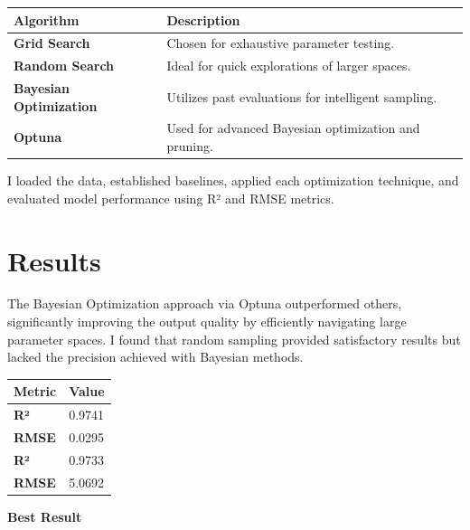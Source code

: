 \documentclass[11pt,a4paper]{article}
\begin{document}
\begin{tabularx}{\linewidth}{@{}>{\bfseries}l X @{}}
  \arrayrulecolor{tableheader}
  \toprule
  \rowcolor{tableheader} Algorithm & Description \\
  \midrule
  \rowcolor{white} Grid Search & Chosen for exhaustive parameter testing. \\
  \rowcolor{tablerow} Random Search & Ideal for quick explorations of larger spaces. \\
  \rowcolor{white} Bayesian Optimization & Utilizes past evaluations for intelligent sampling. \\
  \rowcolor{tablerow} Optuna & Used for advanced Bayesian optimization and pruning. \\
  \bottomrule
\end{tabularx}

I loaded the data, established baselines, applied each optimization technique, and evaluated model performance using R² and RMSE metrics.

\section{Results}

The Bayesian Optimization approach via Optuna outperformed others, significantly improving the output quality by efficiently navigating large parameter spaces. I found that random sampling provided satisfactory results but lacked the precision achieved with Bayesian methods.

\vspace{4pt}

\begin{tabularx}{\linewidth}{@{}>{\bfseries}l X @{}}
  \arrayrulecolor{tableheader}
  \toprule
  \rowcolor{tableheader} Metric & Value \\
  \midrule
  \rowcolor{white} R² & 0.9741 \\
  \rowcolor{tablerow} RMSE & 0.0295 \\
  \rowcolor{white} R² & 0.9733 \\
  \rowcolor{tablerow} RMSE & 5.0692 \\
  \bottomrule
\end{tabularx}

\vspace{4pt}
\begin{resultbox}
  \textbf{\color{accent}Best Result}
\end{resultbox}
\end{document}
